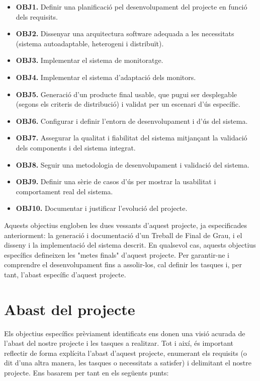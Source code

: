 \begin{itemize}
\item[] \textbf{OBJ1.} Definir una planificació pel desenvolupament del projecte en funció dels requisits.
\item[] \textbf{OBJ2.} Dissenyar una arquitectura software adequada a les necessitats (sistema autoadaptable, heterogeni i distribuït).
\item[] \textbf{OBJ3.} Implementar el sistema de monitoratge.
\item[] \textbf{OBJ4.} Implementar el sistema d'adaptació dels monitors.
\item[] \textbf{OBJ5.} Generació d’un producte final usable, que pugui ser desplegable (segons els criteris de distribució) i validat per un escenari d'ús específic.
\item[] \textbf{OBJ6.} Configurar i definir l’entorn de desenvolupament i d’ús del sistema.
\item[] \textbf{OBJ7.} Assegurar la qualitat i fiabilitat del sistema mitjançant la validació dels components i del sistema integrat.
\item[] \textbf{OBJ8.} Seguir una metodologia de desenvolupament i validació del sistema.
\item[] \textbf{OBJ9.} Definir una sèrie de casos d’ús per mostrar la usabilitat i comportament real del sistema.
\item[] \textbf{OBJ10.} Documentar i justificar l’evolució del projecte.
\end{itemize}

Aquests objectius engloben les dues vessants d'aquest projecte, ja especificades anteriorment: la generació i documentació d'un Treball de Final de Grau, i el disseny i la implementació del sistema descrit. En qualsevol cas, aquests objectius específics defineixen les "metes finals" d'aquest projecte. Per garantir-ne i comprendre el desenvolupament fins a assolir-los, cal definir les tasques i, per tant, l'abast específic d'aquest projecte.


\section{Abast del projecte}

Els objectius específics prèviament identificats ens donen una visió acurada de l’abast del nostre projecte i les tasques a realitzar. Tot i així, és important reflectir de forma explícita l’abast d’aquest projecte, enumerant els requisits (o dit d’una altra manera, les tasques o necessitats a satisfer) i delimitant el nostre projecte. Ens basarem per tant en els següents punts:

